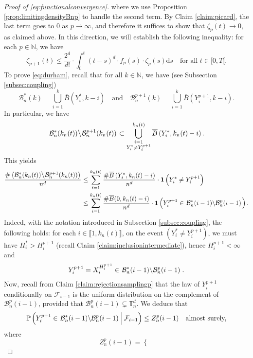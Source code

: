 \documentclass[a4paper,11pt]{article}
\begin{document}
\begin{proof}[Proof of \eqref{eq:functionalconvergence}]
where we use Proposition \ref{prop:limitingdensityBnp} to handle the second term.
By Claim \ref{claim:picard}, the last term goes to $0$ as $p\to\infty$, and therefore it suffices to show that $\zeta_p(t)\rightarrow0$, as claimed above.
In this direction, we will establish the following inequality: for each $p\in\mathbb{N}$, we have
\begin{equation}\label{eq:durham}
\zeta_{p+1}(t)\leq\frac{2^d}{d!}\cdot\int_0^t(t-s)^d\cdot f_p(s)\cdot\zeta_p(s)\mathrm{d}s\quad\text{for all $t\in[0,T[$.}
\end{equation}
To prove \eqref{eq:durham}, recall that for all $k\in\mathbb{N}$, we have (see Subsection \ref{subsec:coupling})
\[\mathcal{B}_n^*(k)=\bigcup_{i=1}^k\overline{B}\left(Y_i^*,k-i\right)\quad\text{and}\quad\mathcal{B}_n^{p+1}(k)=\bigcup_{i=1}^k\overline{B}\left(Y_i^{p+1},k-i\right).\]
In particular, we have
\[\left.\mathcal{B}_n^*(k_n(t))\middle\backslash\mathcal{B}_n^{p+1}(k_n(t))\right.\subset\bigcup_{\substack{i=1\\Y_i^*\neq Y_i^{p+1}}}^{k_n(t)}\overline{B}\left(Y_i^*,k_n(t)-i\right).\]
This yields
\[\begin{split}
\frac{\#\left(\mathcal{B}_n^*(k_n(t))\middle\backslash\mathcal{B}_n^{p+1}(k_n(t))\right)}{n^d}&\leq\sum_{i=1}^{k_n(t)}\frac{\#\overline{B}\left(Y_i^*,k_n(t)-i\right)}{n^d}\cdot\mathbf{1}\left(Y_i^*\neq Y_i^{p+1}\right)\\
&\leq\sum_{i=1}^{k_n(t)}\frac{\#\overline{B}(0,k_n(t)-i)}{n^d}\cdot\mathbf{1}\left(Y_i^{p+1}\in\left.\mathcal{B}_n^*(i-1)\middle\backslash\mathcal{B}_n^p(i-1)\right.\right).
\end{split}\]
Indeed, with the notation introduced in Subsection \ref{subsec:coupling}, the following holds: for each $i\in\llbracket1,k_n(t)\rrbracket$, on the event $\left(Y_i^*\neq Y_i^{p+1}\right)$, we must have $H_i^*>H_i^{p+1}$ (recall Claim \ref{claim:inclusionintermediate}), hence $H_i^{p+1}<\infty$ and
\[Y_i^{p+1}=X_i^{H_i^{p+1}}\in\left.\mathcal{B}_n^*(i-1)\middle\backslash\mathcal{B}_n^p(i-1)\right..\]
Now, recall from Claim \ref{claim:rejectionsamplingp} that the law of $Y_i^{p+1}$ conditionally on $\mathcal{F}_{i-1}$ is the uniform distribution on the complement of $\mathcal{B}_n^p(i-1)$, provided that $\mathcal{B}_n^p(i-1)\varsubsetneq\mathbb{T}_n^d$.
We deduce that
\[\mathbb{P}\left(Y_i^{p+1}\in\left.\mathcal{B}_n^*(i-1)\middle\backslash\mathcal{B}_n^p(i-1)\right.\,\middle|\,\mathcal{F}_{i-1}\right)\leq Z_n^p(i-1)\quad\text{almost surely,}\]
where
\[Z_n^p(i-1)=\begin{cases}

\end{cases}\]
\end{proof}
\end{document}
